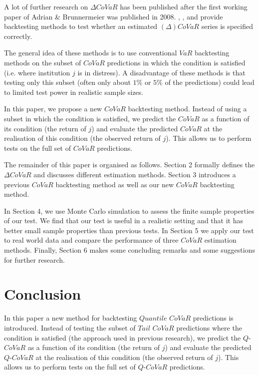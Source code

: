\documentclass[12pt]{article}
\begin{document}
A lot of further research on $\Delta CoVaR$ has been published after the first working paper of Adrian \& Brunnermeier was published in 2008. \citet{girardi}, \citet{copulas}, and \citet{mesbacktest} provide backtesting methods to test whether an estimated $(\Delta) CoVaR$ series is specified correctly. 

The general idea of these methods is to use conventional $VaR$ backtesting methods on the subset of $CoVaR$ predictions in which the condition is satisfied (i.e.  where institution $j$ is in distress). A disadvantage of these methods is that testing only this subset (often only about $1\%$ or $5\%$ of the predictions) could lead to limited test power in realistic sample sizes. 

In this paper, we propose a new $CoVaR$ backtesting method. Instead of using a subset in which the condition is satisfied, we predict the $CoVaR$ as a function of its condition (the return of $j$) and evaluate the predicted $CoVaR$ at the realisation of this condition (the observed return of $j$). This allows us to perform tests on the full set of $CoVaR$ predictions.

The remainder of this paper is organised as follows. Section 2 formally defines the $\Delta CoVaR$ and discusses different estimation methods. Section 3 introduces a previous $CoVaR$ backtesting method as well as our new $CoVaR$ backtesting method. 

In Section 4, we use Monte Carlo simulation to assess the finite sample properties of our test. We find that our test is useful in a realistic setting and that it has better small sample properties than previous tests. In Section 5 we apply our test to real world data and compare the performance of three $CoVaR$ estimation methods. Finally, Section 6 makes some concluding remarks and some suggestions for further research.


  
\section{Conclusion}


In this paper a new method for backtesting $Quantile$ $CoVaR$ predictions is introduced. Instead of testing the subset of $Tail$ $CoVaR$ predictions where the condition is satisfied (the approach used in previous research), we predict the $Q$-$CoVaR$ as a function of its condition (the return of $j$) and evaluate the predicted $Q$-$CoVaR$ at the realisation of this condition (the observed return of $j$). This allows us to perform tests on the full set of $Q$-$CoVaR$ predictions. 
\end{document}
